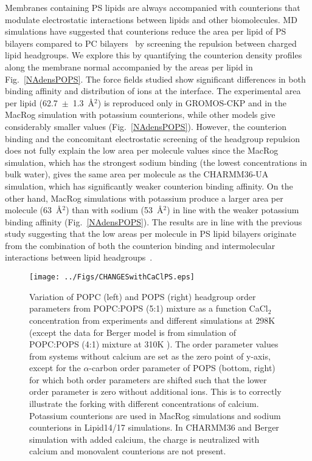 \documentclass[aps,prl,superscriptaddress,twocolumn]{revtex4}
\begin{document}
Membranes containing PS lipids are always accompanied with counterions that
modulate electrostatic interactions between lipids and other biomolecules. MD simulations have suggested
that counterions reduce the area per lipid of PS bilayers compared to PC
bilayers~\cite{pandit02,mukhopadhyay04,pedersen06} by screening the repulsion between charged lipid headgroups. We explore this by quantifying the counterion density profiles along the membrane normal accompanied by the areas per lipid in Fig.~\ref{NAdensPOPS}.
The force fields studied show significant differences in both binding affinity
and distribution of ions at the interface.
The experimental area per lipid (62.7~$\pm$~1.3~\AA$^2$) \cite{pan14} 
is reproduced only in GROMOS-CKP and in the MacRog simulation
with potassium counterions, while other models give considerably smaller values (Fig.~\ref{NAdensPOPS}).
However, the counterion binding and the concomitant electrostatic screening of the headgroup
repulsion does not fully explain the low area per molecule values
since the MacRog simulation, which has the strongest sodium binding
(the lowest concentrations in bulk water), gives the same area per molecule
as the CHARMM36-UA simulation, which has significantly weaker counterion binding
affinity. On the other hand, MacRog simulations with potassium produce a larger area per molecule (63~\AA$^2$) than
with sodium (53~\AA$^2$) in line with the weaker potassium binding affinity (Fig.~\ref{NAdensPOPS}).
The results are in line with the previous study suggesting that the
low areas per molecule in PS lipid bilayers originate from the combination
of both the counterion binding and intermolecular interactions between lipid headgroups~\cite{petrache04}.

\begin{figure*}[ht]
  \centering
  \texttt{[image: ../Figs/CHANGESwithCaClPS.eps]}
  \caption{\label{changesWITHCaClPS}
   Variation of POPC (left) and POPS (right) headgroup order parameters from POPC:POPS (5:1) mixture
    as a function CaCl$_2$ concentration from experiments \cite{roux90} and different simulations
    at 298K (except the data for Berger model is from simulation of POPC:POPS (4:1) mixture at 310K \cite{ollila07a,melcrova16}). 
    The order parameter values from systems without calcium are set as the zero point of y-axis,
    except for the $\alpha$-carbon order parameter of POPS (bottom, right) for which both order parameters are shifted
    such that the lower order parameter is zero without additional ions. This is to correctly illustrate
    the forking with different concentrations of calcium.
    Potassium counterions are used in MacRog simulations and sodium counterions in Lipid14/17 simulations.
    In CHARMM36 and Berger simulation with added calcium, the charge is neutralized with calcium and monovalent counterions are not present.
  }
\end{figure*}
\end{document}

